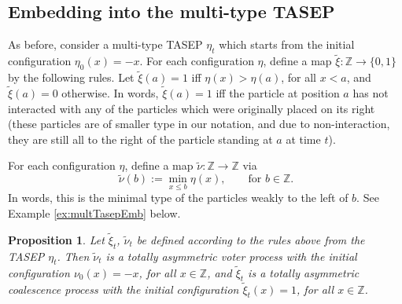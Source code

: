 \documentclass[11pt,reqno]{amsart}
\newtheorem{prop}[thm]{Proposition}
\theoremstyle{definition}
\theoremstyle{remark}
\theoremstyle{remark}
\def\leq{\leqslant}
\renewcommand\le{\leq}
\def\Z{\mathbb Z}
\numberwithin{equation}{section}
\begin{document}
	\subsection{Embedding into the multi-type TASEP}
	\label{sec:Embedding-Voter}
	
	As before, consider a multi-type TASEP $\eta_t$ which starts from the initial configuration $\eta_0(x)=-x$. For each configuration $\eta$, define a map $\tilde \xi: \Z \to \{0,1\}$ by the following rules. Let $\tilde \xi (a) =1$ iff $\eta (x) > \eta (a)$, for all $x < a$, and $\tilde \xi (a) = 0$ otherwise. In words, $\tilde \xi (a) =1$ iff the particle at position $a$ has not interacted with any of the particles which were originally placed on its right (these particles are of smaller type in our notation, and due to non-interaction, they are still all to the right of the particle standing at $a$ at time $t$).
	
	For each configuration $\eta$, define a map $\tilde \nu: \Z \to \Z$ via
	$$
	\tilde \nu(b):= \min_{ x \le b} \eta (x), \qquad \mbox{for $b \in \Z$}.
	$$ 
	In words, this is the minimal type of the particles weakly to the left of $b$. See Example \ref{ex:multTasepEmb} below.
	
	\begin{prop}
		\label{prop:voter-coupling}
		Let $\tilde \xi_t$, $\tilde \nu_t$ be defined according to the rules above from the TASEP $\eta_t$. Then $\tilde \nu_t$ is a totally asymmetric voter process with the initial configuration $\nu_0 (x) = -x$, for all $x \in \Z$, and $\tilde \xi_t$ is a totally asymmetric coalescence process with the initial configuration $\tilde \xi_t (x) =1$, for all $x \in \Z$.
	\end{prop}
	
\end{document}
